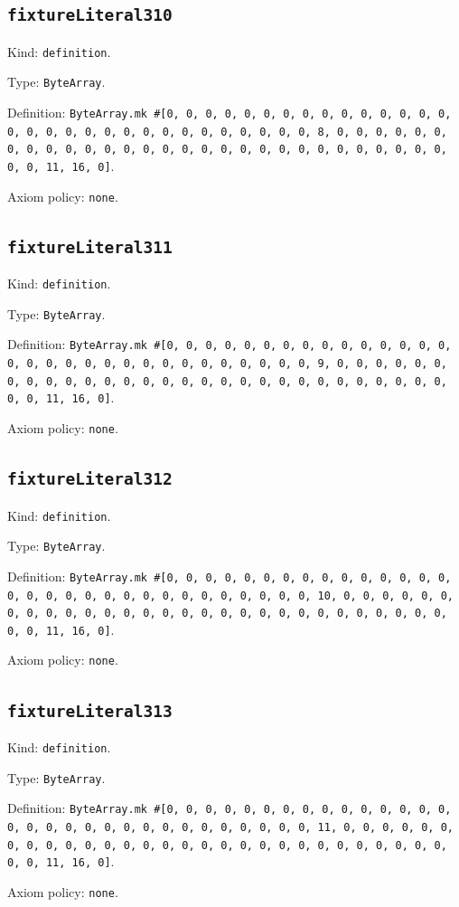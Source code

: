 \documentclass[11pt]{article}
\begin{document}
\subsection*{\texttt{fixtureLiteral310}}
\noindent Kind: \texttt{definition}.\par
\noindent Type: \texttt{ByteArray}.\par
\noindent Definition: \texttt{ByteArray.mk \#[0, 0, 0, 0, 0, 0, 0, 0, 0, 0, 0, 0, 0, 0, 0, 0, 0, 0, 0, 0, 0, 0, 0, 0, 0, 0, 0, 0, 0, 0, 0, 8, 0, 0, 0, 0, 0, 0, 0, 0, 0, 0, 0, 0, 0, 0, 0, 0, 0, 0, 0, 0, 0, 0, 0, 0, 0, 0, 0, 0, 0, 0, 0, 11, 16, 0]}.\par
\noindent Axiom policy: \texttt{none}.\par
\subsection*{\texttt{fixtureLiteral311}}
\noindent Kind: \texttt{definition}.\par
\noindent Type: \texttt{ByteArray}.\par
\noindent Definition: \texttt{ByteArray.mk \#[0, 0, 0, 0, 0, 0, 0, 0, 0, 0, 0, 0, 0, 0, 0, 0, 0, 0, 0, 0, 0, 0, 0, 0, 0, 0, 0, 0, 0, 0, 0, 9, 0, 0, 0, 0, 0, 0, 0, 0, 0, 0, 0, 0, 0, 0, 0, 0, 0, 0, 0, 0, 0, 0, 0, 0, 0, 0, 0, 0, 0, 0, 0, 11, 16, 0]}.\par
\noindent Axiom policy: \texttt{none}.\par
\subsection*{\texttt{fixtureLiteral312}}
\noindent Kind: \texttt{definition}.\par
\noindent Type: \texttt{ByteArray}.\par
\noindent Definition: \texttt{ByteArray.mk \#[0, 0, 0, 0, 0, 0, 0, 0, 0, 0, 0, 0, 0, 0, 0, 0, 0, 0, 0, 0, 0, 0, 0, 0, 0, 0, 0, 0, 0, 0, 0, 10, 0, 0, 0, 0, 0, 0, 0, 0, 0, 0, 0, 0, 0, 0, 0, 0, 0, 0, 0, 0, 0, 0, 0, 0, 0, 0, 0, 0, 0, 0, 0, 11, 16, 0]}.\par
\noindent Axiom policy: \texttt{none}.\par
\subsection*{\texttt{fixtureLiteral313}}
\noindent Kind: \texttt{definition}.\par
\noindent Type: \texttt{ByteArray}.\par
\noindent Definition: \texttt{ByteArray.mk \#[0, 0, 0, 0, 0, 0, 0, 0, 0, 0, 0, 0, 0, 0, 0, 0, 0, 0, 0, 0, 0, 0, 0, 0, 0, 0, 0, 0, 0, 0, 0, 11, 0, 0, 0, 0, 0, 0, 0, 0, 0, 0, 0, 0, 0, 0, 0, 0, 0, 0, 0, 0, 0, 0, 0, 0, 0, 0, 0, 0, 0, 0, 0, 11, 16, 0]}.\par
\noindent Axiom policy: \texttt{none}.\par
\end{document}
